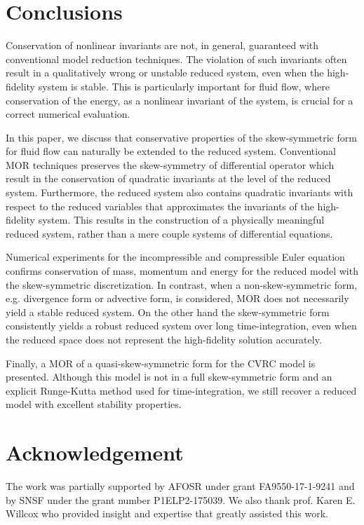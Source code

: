 \section{Conclusions} \label{sec:con}

Conservation of nonlinear invariants are not, in general, guaranteed with conventional model reduction techniques. The violation of such invariants often result in a qualitatively wrong or unstable reduced system, even when the high-fidelity system is stable. This is particularly important for fluid flow, where conservation of the energy, as a nonlinear invariant of the system, is crucial for a correct numerical evaluation.

In this paper, we discuss that conservative properties of the skew-symmetric form for fluid flow can naturally be extended to the reduced system. Conventional MOR techniques preserves the skew-symmetry of differential operator which result in the conservation of quadratic invariants at the level of the reduced system. Furthermore, the reduced system also contains quadratic invariants with respect to the reduced variables that approximates the invariants of the high-fidelity system. This results in the construction of a physically meaningful reduced system, rather than a mere couple systems of differential equations.

Numerical experiments for the incompressible and compressible Euler equation confirms conservation of mass, momentum and energy for the reduced model with the skew-symmetric discretization. In contrast, when a non-skew-symmetric form, e.g. divergence form or advective form, is considered, MOR does not necessarily yield a stable reduced system. On the other hand the skew-symmetric form consistently yields a robust reduced system over long time-integration, even when the reduced space does not represent the high-fidelity solution accurately. 

Finally, a MOR of a quasi-skew-symmetric form for the CVRC model is presented. Although this model is not in a full skew-symmetric form and an explicit Runge-Kutta method used for time-integration, we still recover a reduced model with excellent stability properties. 

\section*{Acknowledgement} The work was partially supported by AFOSR under grant FA9550-17-1-9241 and by SNSF under the grant number P1ELP2-175039. We also thank prof. Karen E. Willcox who provided insight and expertise that greatly assisted this work.
